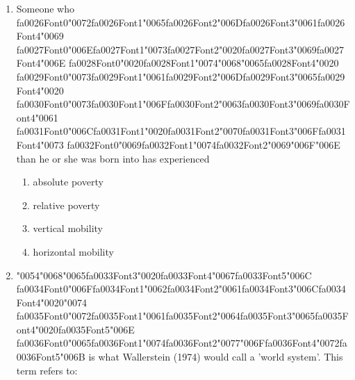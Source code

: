 \documentclass[12pt]{article}
\begin{document}
\begin{enumerate}[label=\arabic*.]
\begin{enumerate}[label=(\alph*)]
\end{enumerate}
\item Someone who {\csname fa0026Font0\endcsname\char"0072}{\csname fa0026Font1\endcsname\char"0065}{\csname fa0026Font2\endcsname\char"006D}{\csname fa0026Font3\endcsname\char"0061}{\csname fa0026Font4\endcsname\char"0069} {\csname fa0027Font0\endcsname\char"006E}{\csname fa0027Font1\endcsname\char"0073}{\csname fa0027Font2\endcsname\char"0020}{\csname fa0027Font3\endcsname\char"0069}{\csname fa0027Font4\endcsname\char"006E} {\csname fa0028Font0\endcsname\char"0020}{\csname fa0028Font1\endcsname\char"0074}{\char"0068}{\char"0065}{\csname fa0028Font4\endcsname\char"0020} {\csname fa0029Font0\endcsname\char"0073}{\csname fa0029Font1\endcsname\char"0061}{\csname fa0029Font2\endcsname\char"006D}{\csname fa0029Font3\endcsname\char"0065}{\csname fa0029Font4\endcsname\char"0020} {\csname fa0030Font0\endcsname\char"0073}{\csname fa0030Font1\endcsname\char"006F}{\csname fa0030Font2\endcsname\char"0063}{\csname fa0030Font3\endcsname\char"0069}{\csname fa0030Font4\endcsname\char"0061} {\csname fa0031Font0\endcsname\char"006C}{\csname fa0031Font1\endcsname\char"0020}{\csname fa0031Font2\endcsname\char"0070}{\csname fa0031Font3\endcsname\char"006F}{\csname fa0031Font4\endcsname\char"0073} {\csname fa0032Font0\endcsname\char"0069}{\csname fa0032Font1\endcsname\char"0074}{\csname fa0032Font2\endcsname\char"0069}{\char"006F}{\char"006E} than he or she was born into has experienced
\begin{enumerate}[label=(\alph*)]
    \item absolute poverty
    \item relative poverty
    \item vertical mobility
    \item horizontal mobility
\end{enumerate}
\item {\char"0054}{\char"0068}{\char"0065}{\csname fa0033Font3\endcsname\char"0020}{\csname fa0033Font4\endcsname\char"0067}{\csname fa0033Font5\endcsname\char"006C} {\csname fa0034Font0\endcsname\char"006F}{\csname fa0034Font1\endcsname\char"0062}{\csname fa0034Font2\endcsname\char"0061}{\csname fa0034Font3\endcsname\char"006C}{\csname fa0034Font4\endcsname\char"0020}{\char"0074} {\csname fa0035Font0\endcsname\char"0072}{\csname fa0035Font1\endcsname\char"0061}{\csname fa0035Font2\endcsname\char"0064}{\csname fa0035Font3\endcsname\char"0065}{\csname fa0035Font4\endcsname\char"0020}{\csname fa0035Font5\endcsname\char"006E} {\csname fa0036Font0\endcsname\char"0065}{\csname fa0036Font1\endcsname\char"0074}{\csname fa0036Font2\endcsname\char"0077}{\char"006F}{\csname fa0036Font4\endcsname\char"0072}{\csname fa0036Font5\endcsname\char"006B} is what Wallerstein (1974) would call a 'world system'. This term refers to:

\end{enumerate}
\end{document}
